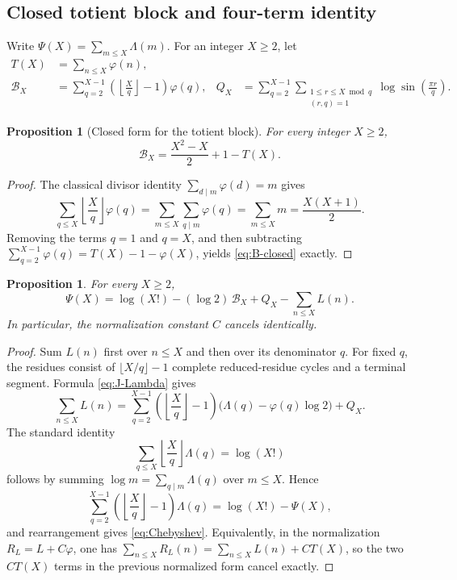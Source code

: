 \documentclass[11pt]{amsart}
\numberwithin{equation}{section}
\newtheorem{proposition}[theorem]{Proposition}
\theoremstyle{definition}
\theoremstyle{remark}
\begin{document}
\subsection{Closed totient block and four-term identity}

Write \(\Psi(X)=\sum_{m\leq X}\Lambda(m)\).  For an integer \(X\geq2\),
let
\begin{align}
 T(X)&=\sum_{n\leq X}\varphi(n),\label{eq:T-def}\\
 \mathcal B_X&=\sum_{q=2}^{X-1}
 \left(\left\lfloor\frac Xq\right\rfloor-1\right)\varphi(q),
 &Q_X&=\sum_{q=2}^{X-1}
 \sum_{\substack{1\leq r\leq X\bmod q\\(r,q)=1}}
 \log\sin\!\left(\frac{\pi r}{q}\right).
 \label{eq:BQ}
\end{align}

\begin{proposition}[Closed form for the totient block]\label{prop:B-closed}
For every integer \(X\geq2\),
\begin{equation}\label{eq:B-closed}
 \mathcal B_X=\frac{X^2-X}{2}+1-T(X).
\end{equation}
\end{proposition}

\begin{proof}
The classical divisor identity \(\sum_{d\mid m}\varphi(d)=m\) gives
\[
 \sum_{q\leq X}\left\lfloor\frac Xq\right\rfloor\varphi(q)
 =\sum_{m\leq X}\sum_{q\mid m}\varphi(q)
 =\sum_{m\leq X}m=\frac{X(X+1)}2.
\]
Removing the terms \(q=1\) and \(q=X\), and then subtracting
\(\sum_{q=2}^{X-1}\varphi(q)=T(X)-1-\varphi(X)\), yields
\eqref{eq:B-closed} exactly.
\end{proof}

\begin{proposition}\label{prop:Chebyshev}
For every \(X\geq2\),
\begin{equation}\label{eq:Chebyshev}
 \boxed{\displaystyle
 \Psi(X)=\log(X!)-(\log2)\,\mathcal B_X+Q_X
 -\sum_{n\leq X}L(n).}
\end{equation}
In particular, the normalization constant \(C\) cancels identically.
\end{proposition}

\begin{proof}
Sum \(L(n)\) first over \(n\leq X\) and then over its denominator \(q\).
For fixed \(q\), the residues consist of
\(\lfloor X/q\rfloor-1\) complete reduced-residue cycles and a terminal
segment.  Formula \eqref{eq:J-Lambda} gives
\[
 \sum_{n\leq X}L(n)
 =\sum_{q=2}^{X-1}
 \left(\left\lfloor\frac Xq\right\rfloor-1\right)
 \bigl(\Lambda(q)-\varphi(q)\log2\bigr)+Q_X.
\]
The standard identity
\[
 \sum_{q\leq X}\left\lfloor\frac Xq\right\rfloor\Lambda(q)
 =\log(X!)
\]
follows by summing \(\log m=\sum_{q\mid m}\Lambda(q)\) over
\(m\leq X\).  Hence
\[
 \sum_{q=2}^{X-1}
 \left(\left\lfloor\frac Xq\right\rfloor-1\right)\Lambda(q)
 =\log(X!)-\Psi(X),
\]
and rearrangement gives \eqref{eq:Chebyshev}.  Equivalently, in the
normalization \(R_L=L+C\varphi\), one has
\(\sum_{n\leq X}R_L(n)=\sum_{n\leq X}L(n)+CT(X)\), so the two
\(CT(X)\) terms in the previous normalized form cancel exactly.
\end{proof}
\end{document}
